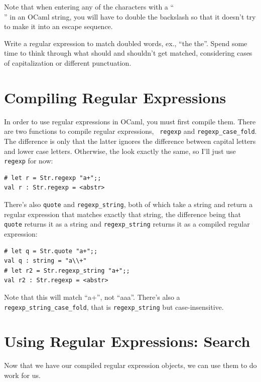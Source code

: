 \documentclass[10pt]{book}
\begin{document}
{Note that when entering any of the characters with a ``\\'' in an OCaml string, you will have to double the backslash so that it doesn't try to make it into an escape sequence.

\begin{ex} \label{ex:regex_doubles}
Write a regular expression to match doubled words, ex., ``the the''. Spend some time to think through what should and shouldn't get matched, considering cases of capitalization or different punctuation.
\end{ex}

\section{Compiling Regular Expressions}

In order to use regular expressions in OCaml, you must first compile
them. There are two functions to compile regular expressions, {\tt
  regexp} and {\tt regexp\_case\_fold}. The difference is only that the
latter ignores the difference between capital letters and lower case
letters. Otherwise, the look exactly the same, so I'll just use {\tt
  regexp} for now:

\beforeverb
\begin{verbatim}
# let r = Str.regexp "a+";;
val r : Str.regexp = <abstr>
\end{verbatim}
\afterverb

There's also {\tt quote} and {\tt regexp\_string}, both of which take a string and return a regular expression that matches exactly that string, the difference being that {\tt quote} returns it as a string and {\tt regexp\_string} returns it as a compiled regular expression:
\beforeverb
\begin{verbatim}
# let q = Str.quote "a+";;
val q : string = "a\\+"
# let r2 = Str.regexp_string "a+";;
val r2 : Str.regexp = <abstr>
\end{verbatim}
\afterverb
Note that this will match ``a+'', not ``aaa''. There's also a {\tt regexp\_string\_case\_fold}, that is {\tt regexp\_string} but case-insensitive.

\section{Using Regular Expressions: Search}

Now that we have our compiled regular expression objects, we can use them to do work for us.

}
\end{document}
